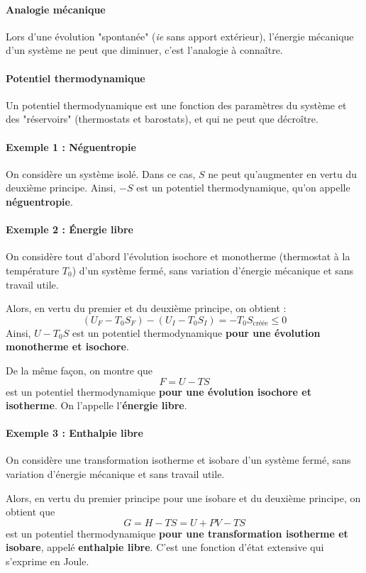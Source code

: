 \documentclass[french]{book}
\theoremstyle{plain}
\theoremstyle{definition}
\theoremstyle{remark}
\begin{document}
\paragraph{Analogie mécanique} Lors d'une évolution "spontanée" (\textit{ie} sans apport extérieur), l'énergie mécanique d'un système ne peut que diminuer, c'est l'analogie à connaître.
\paragraph{Potentiel thermodynamique} Un potentiel thermodynamique est une fonction des paramètres du système et des "réservoirs" (thermostats et barostats), et qui ne peut que décroître.
\paragraph{Exemple 1 : Néguentropie} On considère un système isolé. Dans ce cas, $S$ ne peut qu'augmenter en vertu du deuxième principe. Ainsi, $-S$ est un potentiel thermodynamique, qu'on appelle \textbf{néguentropie}.
\paragraph{Exemple 2 : Énergie libre} On considère tout d'abord l'évolution isochore et monotherme (thermostat à la température $T_0$) d'un système fermé, sans variation d'énergie mécanique et sans travail utile. \\ \par Alors, en vertu du premier et du deuxième principe, on obtient : $$(U_F-T_0S_F)-(U_I-T_0S_I)=-T_0S_\text{créée}\leqslant0$$
Ainsi, $U-T_0S$ est un potentiel thermodynamique \textbf{pour une évolution monotherme et isochore}. \\ \par De la même façon, on montre que $$F=U-TS$$ est un potentiel thermodynamique \textbf{pour une évolution isochore et isotherme}. On l'appelle l'\textbf{énergie libre}. 
\paragraph{Exemple 3 : Enthalpie libre} On considère une transformation isotherme et isobare d'un système fermé, sans variation d'énergie mécanique et sans travail utile. \\ \par Alors, en vertu du premier principe pour une isobare et du deuxième principe, on obtient que $$G=H-TS=U+PV-TS$$ est un potentiel thermodynamique \textbf{pour une transformation isotherme et isobare}, appelé \textbf{enthalpie libre}. C'est une fonction d'état extensive qui s'exprime en Joule.
\end{document}
